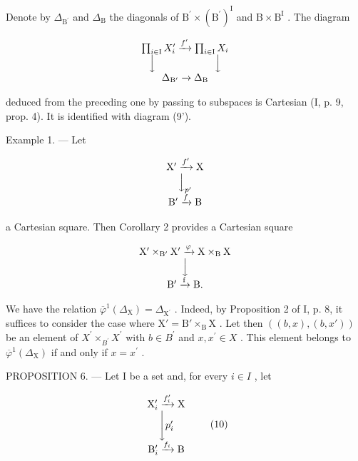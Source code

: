 Denote by \(\Delta_{\mathrm{B}^{\prime}}\) and \(\Delta_{\mathrm{B}}\) the diagonals of \(\mathrm{B}^{\prime}\times (\mathrm{B}^{\prime})^{\mathrm{I}}\) and \(\mathrm{B}\times \mathrm{B}^{\mathrm{I}}\) . The diagram

\[
\begin{array}{c} \prod_ {i \in \mathrm{I}} X _ {i} ^ {\prime} \xrightarrow {f ^ {\prime}} \prod_ {i \in \mathrm{I}} X _ {i} \\ \Big \downarrow \qquad \qquad \qquad \Big \downarrow \\ \Delta_ {\mathrm{B} ^ {\prime}} \xrightarrow {} \Delta_ {\mathrm{B}} \end{array}
\]

deduced from the preceding one by passing to subspaces is Cartesian (I, p. 9, prop. 4). It is identified with diagram (9').

Example 1. --- Let

\[
\begin{array}{c} \mathrm {X^ {\prime}} \xrightarrow {f ^ {\prime}} \mathrm{X} \\ \Big \downarrow_ {p ^ {\prime}} \\ \mathrm {B^ {\prime}} \xrightarrow {f} \mathrm{B} \end{array}
\]

a Cartesian square. Then Corollary 2 provides a Cartesian square

\[
\begin{array}{c} \mathrm {X^ {\prime} \times_ {B^ {\prime}} X^ {\prime}} \xrightarrow {\varphi} \mathrm {X\times_ {B} X} \\ \Big \downarrow \\ \mathrm {B^ {\prime} \xrightarrow {f} B}. \end{array}
\]

We have the relation \(\overline{\varphi}^{1}(\Delta_{\mathrm{X}}) = \Delta_{\mathrm{X}^{\prime}}\) . Indeed, by Proposition 2 of I, p. 8, it suffices to consider the case where \(\mathrm{X}' = \mathrm{B}' \times_{\mathrm{B}} \mathrm{X}\) . Let then \(((b,x),(b,x'))\) be an element of \(X^{\prime} \times_{B^{\prime}} X^{\prime}\) with \(b \in B^{\prime}\) and \(x, x^{\prime} \in X\) . This element belongs to \(\overline{\varphi}^{1}(\Delta_{\mathrm{X}})\) if and only if \(x = x^{\prime}\) .

PROPOSITION 6. --- Let I be a set and, for every \(i \in I\) , let

\[
\begin{array}{c} \mathrm{X} _ {i} ^ {\prime} \xrightarrow {f _ {i} ^ {\prime}} \mathrm{X} \\ \Biggl \downarrow p _ {i} ^ {\prime} \\ \mathrm{B} _ {i} ^ {\prime} \xrightarrow {f _ {i}} \mathrm{B} \end{array}\tag{10}
\]

